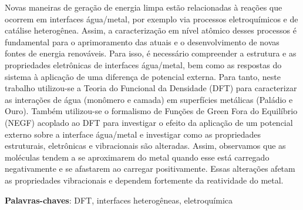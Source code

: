 \begin{resumo}
 



Novas maneiras de geração de energia limpa estão relacionadas à reações que ocorrem em interfaces água/metal, por exemplo via processos eletroquímicos e de catálise heterogênea. Assim, a caracterização em nível atômico desses processos é fundamental para o aprimoramento das atuais e o desenvolvimento de novas fontes de energia renováveis. Para isso, é necessário compreender a estrutura e as propriedades eletrônicas de interfaces água/metal, bem como as respostas do sistema à aplicação de uma diferença de potencial externa. Para tanto, neste trabalho utilizou-se a Teoria do Funcional da Densidade (DFT) para caracterizar as interações de água (monômero e camada) em superfícies metálicas (Paládio e Ouro). Também utilizou-se o formalismo de Funções de Green Fora do Equilíbrio (NEGF) acoplado ao DFT para investigar o efeito da aplicação de um potencial externo sobre a interface água/metal e investigar como as propriedades estruturais, eletrônicas e vibracionais são alteradas. Assim, observamos que as moléculas tendem a se aproximarem do metal quando esse está carregado negativamente e se afastarem ao carregar positivamente. Essas alterações afetam as propriedades vibracionais e dependem fortemente da reatividade do metal.



 \vspace{\onelineskip}
    
 \noindent
 \textbf{Palavras-chaves}:  DFT, interfaces heterogêneas, eletroquímica
\end{resumo}